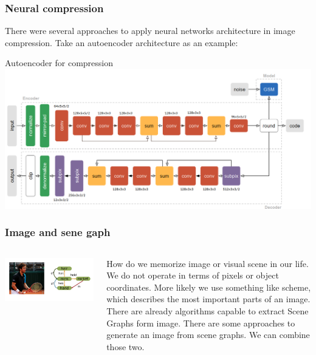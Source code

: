 \documentclass[10pt]{beamer}
\begin{document}
\begin{frame}
    \frametitle{Neural compression}
    There were several approaches to apply neural networks architecture in image compression. Take an autoencoder architecture as an example:
    \begin{block}{Autoencoder for compression}
        \includegraphics[width=\textwidth]{figure/neural-compression.png}
    \end{block}
\end{frame}


\begin{frame}
    \frametitle{Image and sene gaph}
    \begin{columns}
        \begin{column}{0.5\textwidth}
            \includegraphics[width=\textwidth]{figure/image-and-scene-graph.png}
        \end{column}
        \begin{column}{0.5\textwidth}
            How do we memorize image or visual scene in our life. We do not operate in terms of pixels or object coordinates. More likely we use something like scheme, which describes the most important parts of an image.
            There are already algorithms capable to extract Scene Graphs form image. There are some approaches to generate an image from scene graphs. We can combine those two.
        \end{column}
    \end{columns}
\end{frame}
\end{document}
